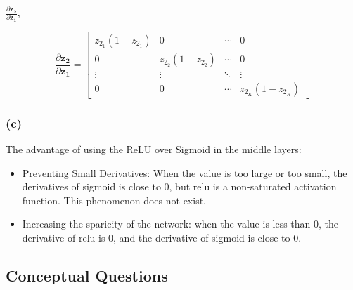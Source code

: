 $\frac{\partial \bm{z_2}}{\partial \bm{z_1}}$, 


\begin{equation}
    \frac{\partial \mathbf{{z_2}}}{\partial \mathbf{{z_1}}}
    =
    \left[
        \begin{array}{cccc}
            z_{2_{1}}(1 - z_{2_{1}}) & 0 & \cdots & 0 \\
            0 & z_{2_{2}}(1 - z_{2_{2}}) & \cdots & 0 \\
            \vdots & \vdots & \ddots & \vdots \\
            0 & 0 & \cdots & z_{2_{K}}(1 - z_{2_{K}})
        \end{array}
    \right]
\end{equation}



\subsubsection{(c)}

The advantage of using the ReLU over Sigmoid in the middle layers:
\begin{itemize}
    \item Preventing Small Derivatives: When the value is too large or too small, the derivatives of sigmoid is close to 0, but relu is a non-saturated activation function. This phenomenon does not exist.
    \item Increasing the sparicity of the network: when the value is less than 0, the derivative of relu is 0, and the derivative of sigmoid is close to 0.
\end{itemize}


\subsection{Conceptual Questions}

